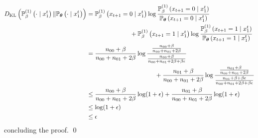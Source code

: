 \begin{align}
D_{\mathrm{KL}}\left(\betaprob{\beta}{1}{\cdot \mid x_1^t} \| \thetaprob{\cdot \mid x_1^t}\right) &= \betaprob{\beta}{1}{x_{t+1}=0 \mid x_1^t} \log \frac{\betaprob{\beta}{1}{x_{t+1}=0 \mid x_1^t}}{\thetaprob{x_{t+1}=0 \mid x_1^t}} \notag\\
    &\hspace{7em}+ \betaprob{\beta}{1}{x_{t+1}=1 \mid x_1^t} \log \frac{\betaprob{\beta}{1}{x_{t+1}=1 \mid x_1^t}}{\thetaprob{x_{t+1}=1 \mid x_1^t}} \\
    &= \frac{n_{00} + \beta}{n_{00} + n_{01} + 2\beta} \log \frac{\frac{n_{00} + \beta}{n_{00} + n_{01} + 2\beta}}{\frac{n_{00} + \beta}{n_{00} + n_{01} + 2\beta + \beta\epsilon}} \notag\\
    &\hspace{11em}+ \frac{n_{01} + \beta}{n_{00} + n_{01} + 2\beta} \log\frac{\frac{n_{01} + \beta}{n_{00} + n_{01} + 2\beta}}{\frac{n_{01} + \beta + \beta\epsilon}{n_{00} + n_{01} + 2\beta + \beta\epsilon}} \\
    &\leq \frac{n_{00} + \beta}{n_{00} + n_{01} + 2\beta} \log(1+\epsilon) + \frac{n_{01} + \beta}{n_{00} + n_{01} + 2\beta} \log(1+\epsilon) \\
    &\leq \log(1+\epsilon) \\
    &\leq \epsilon
\end{align}
concluding the proof. \qed




